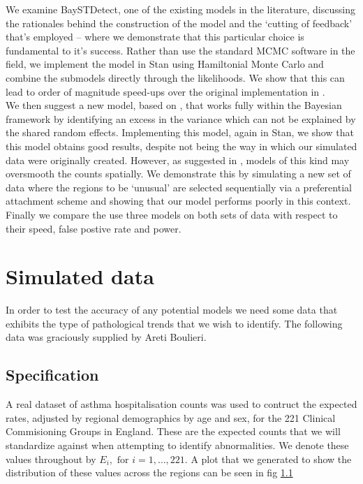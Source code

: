 \documentclass{report}
\begin{document}
We examine BaySTDetect, one of the existing models in the literature, discussing the rationales behind the construction of the model and the `cutting of feedback' that's employed -- where we demonstrate that this particular choice is fundamental to it's success. Rather than use the standard MCMC software in the field, we implement the model in Stan using Hamiltonial Monte Carlo and combine the submodels directly through the likelihoods. We show that this can lead to order of magnitude speed-ups over the original implementation in \cite{baystdetect}. \\

We then suggest a new model, based on \cite{stability}, that works fully within the Bayesian framework by identifying an excess in the variance which can not be explained by the shared random effects. Implementing this model, again in Stan, we show that this model obtains good results, despite not being the way in which our simulated data were originally created. However, as suggested in \cite{best2005comparison}, models of this kind may oversmooth the counts spatially. We demonstrate this by simulating a new set of data where the regions to be `unusual' are selected sequentially via a preferential attachment scheme and showing that our model performs poorly in this context. \\

Finally we compare the use three models on both sets of data with respect to their speed, false postive rate and power.

\chapter{Simulated data}

In order to test the accuracy of any potential models we need some data that exhibits the type of pathological trends that we wish to identify. The following data was graciously supplied by Areti Boulieri.

\section{Specification}

A real dataset of asthma hospitalisation counts was used to contruct the expected rates, adjusted by regional demographics by age and sex, for the 221 Clinical Commisioning Groups in England. These are the expected counts that we will standardize against when attempting to identify abnormalities. We denote these values throughout by $E_{i}, \text{ for } i=1,\ldots,221$. A plot that we generated to show the distribution of these values across the regions can be seen in fig \ref{}  \\
\end{document}
